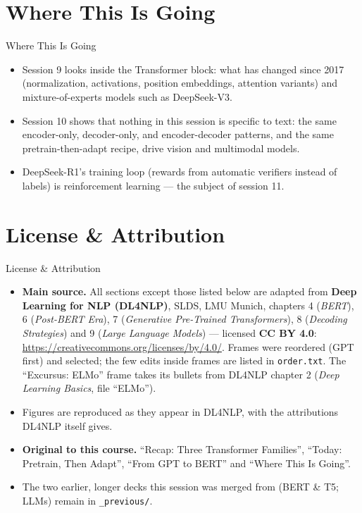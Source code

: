 \section{Where This Is Going}
\begin{vbframe}{Where This Is Going}
\begin{itemize}
  \item Session 9 looks inside the Transformer block: what has changed since 2017 (normalization, activations, position embeddings, attention variants) and mixture-of-experts models such as DeepSeek-V3.
  \item Session 10 shows that nothing in this session is specific to text: the same encoder-only, decoder-only, and encoder-decoder patterns, and the same pretrain-then-adapt recipe, drive vision and multimodal models.
  \item DeepSeek-R1's training loop (rewards from automatic verifiers instead of labels) is reinforcement learning --- the subject of session 11.
\end{itemize}
\end{vbframe}



\section{License \& Attribution}

\begin{frame}{License \& Attribution}
\footnotesize
\begin{itemize}
\item \textbf{Main source.} All sections except those listed below are adapted from \textbf{Deep Learning for NLP (DL4NLP)}, SLDS, LMU Munich, chapters 4 (\textit{BERT}), 6 (\textit{Post-BERT Era}), 7 (\textit{Generative Pre-Trained Transformers}), 8 (\textit{Decoding Strategies}) and 9 (\textit{Large Language Models}) --- licensed \textbf{CC BY 4.0}: \url{https://creativecommons.org/licenses/by/4.0/}. Frames were reordered (GPT first) and selected; the few edits inside frames are listed in \texttt{order.txt}. The \enquote{Excursus: ELMo} frame takes its bullets from DL4NLP chapter 2 (\textit{Deep Learning Basics}, file \enquote{ELMo}).
\item Figures are reproduced as they appear in DL4NLP, with the attributions DL4NLP itself gives.
\item \textbf{Original to this course.} \enquote{Recap: Three Transformer Families}, \enquote{Today: Pretrain, Then Adapt}, \enquote{From GPT to BERT} and \enquote{Where This Is Going}.
\item The two earlier, longer decks this session was merged from (BERT \& T5; LLMs) remain in \texttt{\_previous/}.
\end{itemize}
\end{frame}

\endlecture

